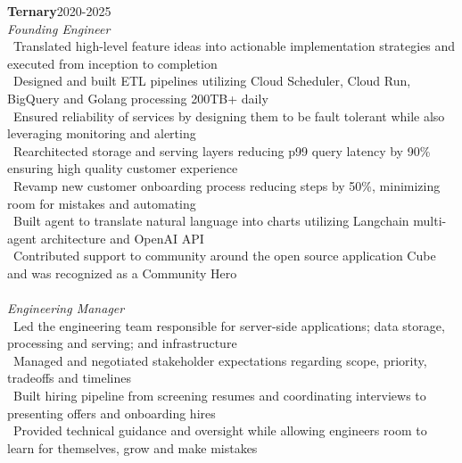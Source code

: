 \documentclass[a4paper,10pt]{article}
\renewcommand{\subsection}[2]{{\noindent \textbf{#1}\hfill \textsc{#2}\\}}
\begin{document}
\subsection{Ternary}{2020-2025}
\textit{Founding Engineer}\\
\textbullet\ Translated high-level feature ideas into actionable implementation strategies and executed from inception to completion\\
\textbullet\ Designed and built ETL pipelines utilizing Cloud Scheduler, Cloud Run, BigQuery and Golang processing 200TB+ daily\\
\textbullet\ Ensured reliability of services by designing them to be fault tolerant while also leveraging monitoring and alerting\\
\textbullet\ Rearchitected storage and serving layers reducing p99 query latency by 90\% ensuring high quality customer experience\\
\textbullet\ Revamp new customer onboarding process reducing steps by 50\%, minimizing room for mistakes and automating\\
\textbullet\ Built agent to translate natural language into charts utilizing Langchain multi-agent architecture and OpenAI API\\
\textbullet\ Contributed support to community around the open source application Cube and was recognized as a Community Hero\\ \\
\textit{Engineering Manager}\\
\textbullet\ Led the engineering team responsible for server-side applications; data storage, processing and serving; and infrastructure\\
\textbullet\ Managed and negotiated stakeholder expectations regarding scope, priority, tradeoffs and timelines\\
\textbullet\ Built hiring pipeline from screening resumes and coordinating interviews to presenting offers and onboarding hires\\
\textbullet\ Provided technical guidance and oversight while allowing engineers room to learn for themselves, grow and make mistakes\\
\end{document}
